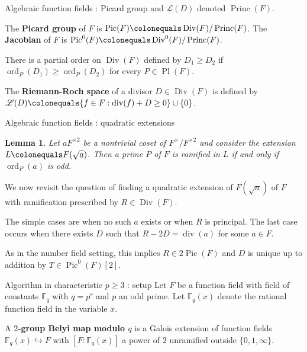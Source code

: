 \documentclass[xcolor=dvipsnames]{beamer}
\theoremstyle{plain}
\newtheorem*{lem}{Lemma}
\newcommand{\FF}{\mathbb{F}}
\DeclareMathOperator{\Div}{Div}
\DeclareMathOperator{\Princ}{Princ}
\DeclareMathOperator{\Pic}{Pic}
\DeclareMathOperator{\ddiv}{div}
\DeclareMathOperator{\ord}{ord}
\DeclareMathOperator{\Pl}{Pl}
\begin{document}
{\begin{frame}{Algebraic function fields : Picard group and $\mathscr{L}(D)$}
      denoted $\Princ(F)$.
      \pause\par
      The \textbf{Picard group} of $F$ is
      $\Pic(F)\colonequals\Div(F)/\Princ(F)$.
      \newline
      The \textbf{Jacobian} of $F$ is
      $\Pic^0(F)\colonequals\Div^0(F)/\Princ(F)$.
      \pause\par
      There is a partial order on $\Div(F)$
      defined by $D_1\geq D_2$ if
      $\ord_P(D_1)\geq\ord_P(D_2)$ for
      every $P\in\Pl(F)$.
      \pause\par
      The \textbf{Riemann-Roch space} of a divisor
      $D\in\Div(F)$ is defined by
      $\mathscr{L}(D)\colonequals\{f\in F : \ddiv(f)+D\geq 0\}\cup\{0\}$.
    \end{frame}
    \begin{frame}{Algebraic function fields : quadratic extensions}
      \begin{lem}
        \vspace{1pt}
        Let $aF^{\times 2}$ be a nontrivial coset of
        $F^\times/F^{\times 2}$ and consider the
        extension $L\colonequals F(\sqrt{a})$.
        Then a prime $P$ of $F$ is
        ramified in $L$
        if and only if
        $\ord_P(a)$ is odd.
      \end{lem}
      \pause
      We now revisit the question of finding a quadratic extension
      of $F(\sqrt{a})$ of $F$ with ramification prescribed
      by $R\in\Div(F)$.
      \pause\par
      The simple cases are when no such $a$ exists
      or when $R$ is principal.
      The last case occurs when there exists
      $D$ such that $R-2D=\ddiv(a)$ for some $a\in F$.
      \pause\par
      As in the number field setting, this implies
      $R\in 2\Pic(F)$ and $D$ is unique up to
      addition by $T\in\Pic^0(F)[2]$.
    \end{frame}
    \begin{frame}{Algorithm in characteristic $p\geq 3$ : setup}
      Let $F$ be a function field with
      field of constants $\FF_q$
      with $q=p^r$ and $p$ an odd prime.
      Let $\FF_q(x)$ denote the rational function field
      in the variable $x$.
      \pause\par
      A \textbf{$2$-group Belyi map modulo $q$}
      is a Galois extension of function fields
      $\FF_q(x)\hookrightarrow F$
      with $[F:\FF_q(x)]$ a power of $2$
      unramified outside $\{0,1,\infty\}$.
      \pause\par

\end{frame}}
\end{document}
